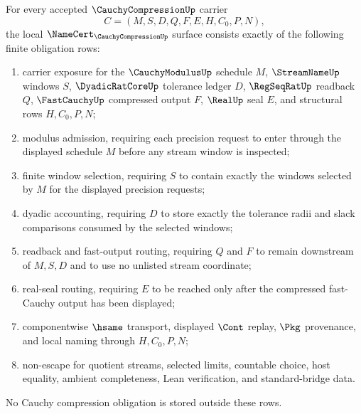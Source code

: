 \begin{theorem}
\label{thm:cauchy-compression-namecert-obligations}
For every accepted $\CauchyCompressionUp$ carrier
$$
C=(M,S,D,Q,F,E,H,C_0,P,N),
$$
the local $\NameCert_{\CauchyCompressionUp}$ surface consists exactly of the following finite obligation rows:
\begin{enumerate}
\item carrier exposure for the $\CauchyModulusUp$ schedule $M$, $\StreamNameUp$ windows $S$, $\DyadicRatCoreUp$ tolerance ledger $D$, $\RegSeqRatUp$ readback $Q$, $\FastCauchyUp$ compressed output $F$, $\RealUp$ seal $E$, and structural rows $H,C_0,P,N$;
\item modulus admission, requiring each precision request to enter through the displayed schedule $M$ before any stream window is inspected;
\item finite window selection, requiring $S$ to contain exactly the windows selected by $M$ for the displayed precision requests;
\item dyadic accounting, requiring $D$ to store exactly the tolerance radii and slack comparisons consumed by the selected windows;
\item readback and fast-output routing, requiring $Q$ and $F$ to remain downstream of $M,S,D$ and to use no unlisted stream coordinate;
\item real-seal routing, requiring $E$ to be reached only after the compressed fast-Cauchy output has been displayed;
\item componentwise $\hsame$ transport, displayed $\Cont$ replay, $\Pkg$ provenance, and local naming through $H,C_0,P,N$;
\item non-escape for quotient streams, selected limits, countable choice, host equality, ambient completeness, Lean verification, and standard-bridge data.
\end{enumerate}
No Cauchy compression obligation is stored outside these rows.
\end{theorem}
